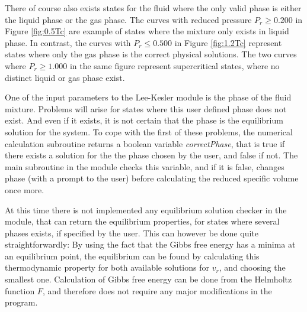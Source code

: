 \documentclass[internal,english]{sintefmemo2012}
\numberwithin{equation}{section}
\begin{document}
There of course also exists states for the fluid where the only valid phase is either the liquid phase or the gas phase. The curves with reduced pressure $P_r \geq 0.200$ in Figure \ref{fig:0.5Tc} are example of states where the mixture only exists in liquid phase. In contrast, the curves with $P_r \leq 0.500$ in Figure \ref{fig:1.2Tc} represent states where only the gas phase is the correct physical solutions. The two curves where $P_r \geq 1.000$ in the same figure represent supercritical states, where no distinct liquid or gas phase exist. 

One of the input parameters to the Lee-Kesler module is the phase of the fluid mixture. Problems will arise for states where this user defined phase does not exist. And even if it exists, it is not certain that the phase is the equilibrium solution for the system. To cope with the first of these problems, the numerical calculation subroutine returns a boolean variable \textit{correctPhase}, that is true if there exists a solution for the the phase chosen by the user, and false if not. The main subroutine in the module checks this variable, and if it is false, changes phase (with a prompt to the user) before calculating the reduced specific volume once more. 

At this time there is not implemented any equilibrium solution checker in the module, that can return the equilibrium properties, for states where several phases exists, if specified by the user. This can however be done quite straightforwardly: By using the fact that the Gibbs free energy has a minima at an equilibrium point, the equilibrium can be found by calculating this thermodynamic property for both available solutions for $v_r$, and choosing the smallest one. Calculation of Gibbs free energy can be done from the Helmholtz function $F$, and therefore does not require any major modifications in the program.
\end{document}
